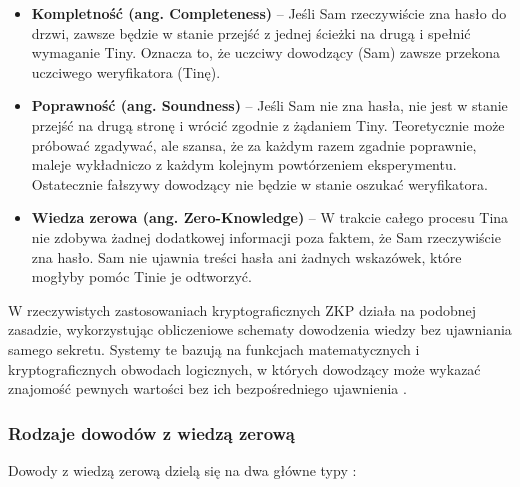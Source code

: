 \documentclass{article}
\begin{document}
\begin{itemize}
    \item \textbf{Kompletność (ang. Completeness)} – Jeśli Sam rzeczywiście zna hasło do drzwi, zawsze będzie w stanie przejść z jednej ścieżki na drugą i spełnić wymaganie Tiny. Oznacza to, że uczciwy dowodzący (Sam) zawsze przekona uczciwego weryfikatora (Tinę).
    
    \item \textbf{Poprawność (ang. Soundness)} – Jeśli Sam nie zna hasła, nie jest w stanie przejść na drugą stronę i wrócić zgodnie z żądaniem Tiny. Teoretycznie może próbować zgadywać, ale szansa, że za każdym razem zgadnie poprawnie, maleje wykładniczo z każdym kolejnym powtórzeniem eksperymentu. Ostatecznie fałszywy dowodzący nie będzie w stanie oszukać weryfikatora.
    
    \item \textbf{Wiedza zerowa (ang. Zero-Knowledge)} – W trakcie całego procesu Tina nie zdobywa żadnej dodatkowej informacji poza faktem, że Sam rzeczywiście zna hasło. Sam nie ujawnia treści hasła ani żadnych wskazówek, które mogłyby pomóc Tinie je odtworzyć.
\end{itemize}

W rzeczywistych zastosowaniach kryptograficznych ZKP działa na podobnej zasadzie, wykorzystując obliczeniowe schematy dowodzenia wiedzy 
bez ujawniania samego sekretu. Systemy te bazują na funkcjach matematycznych i kryptograficznych obwodach logicznych, 
w których dowodzący może wykazać znajomość pewnych wartości bez ich bezpośredniego ujawnienia \cite{zkp_chainlink}.


\subsubsection{Rodzaje dowodów z wiedzą zerową}
Dowody z wiedzą zerową dzielą się na dwa główne typy \cite{zkp_chainlink} \cite{zkp_nfting}:
\end{document}
